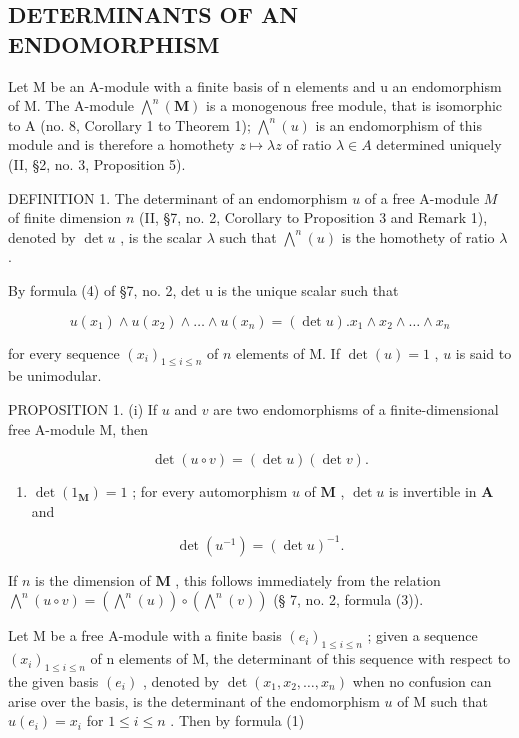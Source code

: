 \subsection{DETERMINANTS OF AN ENDOMORPHISM}

Let M be an A-module with a finite basis of n elements and u an endomorphism of M. The A-module \(\bigwedge^{n}(\mathbf{M})\) is a monogenous free module, that is isomorphic to A (no. 8, Corollary 1 to Theorem 1); \(\bigwedge^{n}(u)\) is an endomorphism of this module and is therefore a homothety \(z \mapsto \lambda z\) of ratio \(\lambda \in A\) determined uniquely (II, §2, no. 3, Proposition 5).

DEFINITION 1. The determinant of an endomorphism \(u\) of a free A-module \(M\) of finite dimension \(n\) (II, §7, no. 2, Corollary to Proposition 3 and Remark 1), denoted by \(\det u\) , is the scalar \(\lambda\) such that \(\bigwedge^{n}(u)\) is the homothety of ratio \(\lambda\) .

By formula (4) of §7, no. 2, det u is the unique scalar such that

\[
u \left(x _ {1}\right) \wedge u \left(x _ {2}\right) \wedge \dots \wedge u \left(x _ {n}\right) = (\det u). x _ {1} \wedge x _ {2} \wedge \dots \wedge x _ {n}\tag{1}
\]

for every sequence \((x_{i})_{1\leqslant i\leqslant n}\) of \(n\) elements of M. If \(\det (u) = 1\) , \(u\) is said to be unimodular.

PROPOSITION 1. (i) If \(u\) and \(v\) are two endomorphisms of a finite-dimensional free A-module M, then

\[
\det (u \circ v) = (\det u) (\det v).\tag{2}
\]

\begin{enumerate}
\def\labelenumi{(\roman{enumi})}
\setcounter{enumi}{1}
\tightlist
\item
  \(\operatorname{det}(1_{\mathbf{M}}) = 1\) ; for every automorphism \(u\) of \(\mathbf{M}\) , \(\operatorname{det} u\) is invertible in \(\mathbf{A}\) and
\end{enumerate}

\[
\det (u ^ {- 1}) = (\det u) ^ {- 1}.\tag{3}
\]

If \(n\) is the dimension of \(\mathbf{M}\) , this follows immediately from the relation \(\bigwedge^{n}(u \circ v) = (\bigwedge^{n}(u)) \circ (\bigwedge^{n}(v))\) (§ 7, no. 2, formula (3)).

Let M be a free A-module with a finite basis \((e_{i})_{1\leqslant i\leqslant n}\) ; given a sequence \((x_{i})_{1\leqslant i\leqslant n}\) of n elements of M, the determinant of this sequence with respect to the given basis \((e_i)\) , denoted by \(\det(x_1, x_2, \ldots, x_n)\) when no confusion can arise over the basis, is the determinant of the endomorphism \(u\) of M such that \(u(e_i) = x_i\) for \(1 \leqslant i \leqslant n\) . Then by formula (1)

